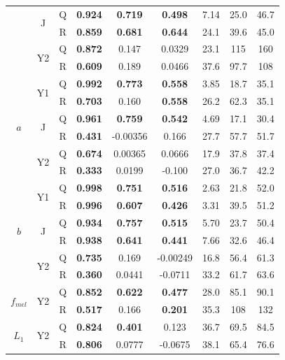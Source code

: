 \begin{table}[htb!]
\begin{tabular}{|ccc|ccc|ccc|}
        \cline{2-9}
        & \multirow{2}{*}{J} & Q & \textbf{0.924} & \textbf{0.719} & \textbf{0.498} & 7.14 & 25.0 & 46.7 \\
        & & R & \textbf{0.859} & \textbf{0.681} & \textbf{0.644} & 24.1 & 39.6 & 45.0 \\
        \cline{2-9}
        & \multirow{2}{*}{Y2} & Q & \textbf{0.872} & 0.147 & 0.0329 & 23.1 & 115 & 160 \\
        & & R & \textbf{0.609} & 0.189 & 0.0466 & 37.6 & 97.7 & 108 \\
        \hline
        \multirow{6}{*}{$a$} & \multirow{2}{*}{Y1} & Q & \textbf{0.992} & \textbf{0.773} & \textbf{0.558} & 3.85 & 18.7 & 35.1 \\
        & & R & \textbf{0.703} & 0.160 & \textbf{0.558} & 26.2 & 62.3 & 35.1 \\
        \cline{2-9}
        & \multirow{2}{*}{J} & Q & \textbf{0.961} & \textbf{0.759} & \textbf{0.542} & 4.69 & 17.1 & 30.4 \\
        & & R & \textbf{0.431} & -0.00356 & 0.166 & 27.7 & 57.7 & 51.7 \\
        \cline{2-9}
        & \multirow{2}{*}{Y2} & Q & \textbf{0.674} & 0.00365 & 0.0666 & 17.9 & 37.8 & 37.4 \\
        & & R & \textbf{0.333} & 0.0199 & -0.100 & 27.0 & 36.7 & 42.2 \\
        \hline
        \multirow{6}{*}{$b$} & \multirow{2}{*}{Y1} & Q & \textbf{0.998} & \textbf{0.751} & \textbf{0.516} & 2.63 & 21.8 & 52.0 \\
        & & R & \textbf{0.996} & \textbf{0.607} & \textbf{0.426} & 3.31 & 39.5 & 51.2 \\
        \cline{2-9}
        & \multirow{2}{*}{J} & Q & \textbf{0.934} & \textbf{0.757} & \textbf{0.515} & 5.70 & 23.7 & 50.4 \\
        & & R & \textbf{0.938} & \textbf{0.641} & \textbf{0.441} & 7.66 & 32.6 & 46.4 \\
        \cline{2-9}
        & \multirow{2}{*}{Y2} & Q & \textbf{0.735} & 0.169 & -0.00249 & 16.8 & 56.4 & 61.3 \\
        & & R & \textbf{0.360} & 0.0441 & -0.0711 & 33.2 & 61.7 & 63.6 \\
        \hline
        \multirow{2}{*}{$f_{mel}$} & \multirow{2}{*}{Y2} & Q & \textbf{0.852} & \textbf{0.622} & \textbf{0.477} & 28.0 & 85.1 & 90.1 \\ 
        & & R & \textbf{0.517} & 0.166 & \textbf{0.201} & 35.3 & 108 & 132 \\
        \hline
        \multirow{2}{*}{$L_1$} & \multirow{2}{*}{Y2} & Q & \textbf{0.824} & \textbf{0.401} & 0.123 & 36.7 & 69.5 & 84.5 \\
        & & R & \textbf{0.806} & 0.0777 & -0.0675 & 38.1 & 65.4 & 76.6 \\
        \hline
    \end{tabular}    
    \label{tb:backwardsHSIMC}
\end{table}

